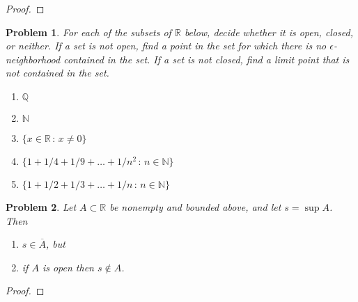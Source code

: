 \documentclass[12pt]{article}
\newtheorem{problem}{Problem}
\newcommand{\NN}{\ensuremath{\mathbb N}}
\newcommand{\QQ}{\ensuremath{\mathbb Q}}
\newcommand{\RR}{\ensuremath{\mathbb R}}
\newcommand{\eps}{\ensuremath{\epsilon}}
\begin{document}
\begin{proof}
\end{proof}


\begin{problem} %
For each of the subsets of $\RR$ below, decide whether it is open, closed, or neither.  If a set is not open, find a point in the set for which there is no $\eps$-neighborhood contained in the set.  If a set is not closed, find a limit point that is not contained in the set.

\renewcommand{\labelenumi}{\emph{(\alph{enumi})}}
\begin{enumerate}
\item $\QQ$


\item $\NN$


\item $\{x\in\RR\,:\,x \ne 0\}$


\item $\{1 + 1/4 + 1/9 + \dots + 1/n^2\,:\,n\in \NN\}$


\item $\{1 + 1/2 + 1/3 + \dots + 1/n \,:\,n \in \NN\}$

\end{enumerate}
\end{problem}


\begin{problem} %
Let $A\subset \RR$ be nonempty and bounded above, and let $s=\sup A$.  Then
\renewcommand{\labelenumi}{\emph{(\roman{enumi})}}
\begin{enumerate}
\item $s \in \overline{A}$, but
\item if $A$ is open then $s \notin A$.
\end{enumerate}
\end{problem}


\begin{proof}
\end{proof}
\end{document}
